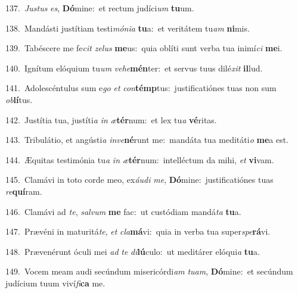 {\numbfont\textcolor{\numbcolor}{137.}}~\-\textit{Jus}\-\textit{tus} \textit{es}\-, \textbf{Dó}\-mine:~\star et rectum judíci\textit{um} \textbf{tu}\-um.\par
{\numbfont\textcolor{\numbcolor}{138.}}~Mandásti justítiam testi\-\textit{mó}\-\textit{ni}\textit{a} \textbf{tu}\-a:~\star et veritátem tu\textit{am} \textbf{ni}\-mis.\par
{\numbfont\textcolor{\numbcolor}{139.}}~Tabéscere me fe\textit{cit} \textit{ze}\-\textit{lus} \textbf{me}\-us:~\star quia oblíti sunt verba tua inimí\textit{ci} \textbf{me}\-i.\par
{\numbfont\textcolor{\numbcolor}{140.}}~Ignítum elóquium tu\textit{um} \textit{ve}\-\textit{he}\textbf{mén}ter:~\star et servus tuus dilé\textit{xit} \textbf{il}\-lud.\par
{\numbfont\textcolor{\numbcolor}{141.}}~Adolescéntulus sum e\textit{go} \textit{et} \textit{con}\-\textbf{témp}tus:~\star justificatiónes tuas non sum \textit{ob}\-\textbf{lí}tus.\par
{\numbfont\textcolor{\numbcolor}{142.}}~Justítia tua, justíti\textit{a} \textit{in} \textit{æ}\-\textbf{tér}num:~\star et lex tu\textit{a} \textbf{vé}\-ritas.\par
{\numbfont\textcolor{\numbcolor}{143.}}~Tribulátio, et angústi\textit{a} \textit{in}\-\textit{ve}\textbf{né}runt me:~\star mandáta tua meditáti\textit{o} \textbf{me}\-a est.\par
{\numbfont\textcolor{\numbcolor}{144.}}~Æquitas testimónia tu\textit{a} \textit{in} \textit{æ}\-\textbf{tér}num:~\star intelléctum da mihi, \textit{et} \textbf{vi}\-vam.\par
{\numbfont\textcolor{\numbcolor}{145.}}~Clamávi in toto corde meo, ex\-\textit{áu}\-\textit{di} \textit{me}\-, \textbf{Dó}\-mine:~\star justificatiónes tuas \textit{re}\-\textbf{quí}ram.\par
{\numbfont\textcolor{\numbcolor}{146.}}~Clamávi ad \textit{te}\-, \textit{sal}\-\textit{vum} \textbf{me} fac:~\star ut custódiam mandá\textit{ta} \textbf{tu}\-a.\par
{\numbfont\textcolor{\numbcolor}{147.}}~Prævéni in maturitá\-\textit{te}\-, \textit{et} \textit{cla}\-\textbf{má}vi:~\star quia in verba tua super\-\textit{spe}\-\textbf{rá}vi.\par
{\numbfont\textcolor{\numbcolor}{148.}}~Prævenérunt óculi mei \textit{ad} \textit{te} \textit{di}\-\textbf{lú}culo:~\star ut meditárer elóqui\textit{a} \textbf{tu}\-a.\par
{\numbfont\textcolor{\numbcolor}{149.}}~Vocem meam audi secúndum misericórdi\textit{am} \textit{tu}\-\textit{am}, \textbf{Dó}\-mine:~\star et secúndum judícium tuum viví\-\textit{fi}\-\textbf{ca} me.\par
